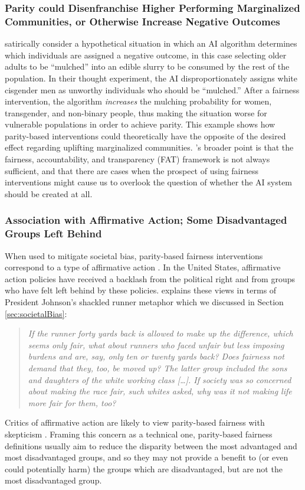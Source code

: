 \documentclass[11pt,dvipdfm]{article}
\begin{document}
\subsubsection{Parity could Disenfranchise Higher Performing Marginalized Communities, or Otherwise Increase Negative Outcomes}
\cite{keyes2019mulching} satirically consider a hypothetical situation in which an AI algorithm determines which individuals are assigned a negative outcome, in this case  selecting older adults to be ``mulched'' into an edible slurry to be consumed by the rest of the population.  In their thought experiment, the AI disproportionately assigns white cisgender men as unworthy individuals who should be ``mulched.''  After a fairness intervention, the algorithm \emph{increases} the mulching probability for women, transgender, and non-binary people, thus making the situation worse for vulnerable populations in order to achieve parity.  This example shows how parity-based interventions could theoretically have the opposite of the desired effect regarding uplifting marginalized communities.  \cite{keyes2019mulching}'s broader point is that the fairness, accountability, and transparency (FAT) framework is not always sufficient, and that there are cases when the prospect of using fairness interventions might cause us to overlook the question of whether the AI system should be created at all. 

\subsubsection{Association with Affirmative Action; Some Disadvantaged Groups Left Behind}
\label{sec:affirmativeAct}
When used to mitigate societal bias, parity-based fairness interventions correspond to a type of affirmative action \cite{Landeau2020}.  In the United States, affirmative action policies have received a backlash from the political right and from groups who have felt left behind by these policies. \cite{dionne2004americans} explains these views in terms of President Johnson's shackled runner metaphor \cite{johnson1965remarks} which we discussed in Section \ref{sec:societalBias}:
\begin{quote}
    \emph{If the runner forty yards back is allowed to make up the difference, which seems only fair, what about runners who faced unfair but less imposing burdens and are, say, only ten or twenty yards back?  Does fairness not demand that they, too, be moved up? The latter group included the sons and daughters of the white working class [\ldots].  If society was so concerned about making the race fair, such whites asked, why was it not making life more fair for \emph{them}, too?}
\end{quote}
Critics of affirmative action are likely to view parity-based fairness with skepticism \cite{Landeau2020}.  Framing this concern as a technical one, parity-based fairness definitions usually aim to reduce the disparity between the most advantaged and most disadvantaged groups, and so they may not provide a benefit to (or even could potentially harm) the groups which are disadvantaged, but are not the most disadvantaged group. 
\end{document}

